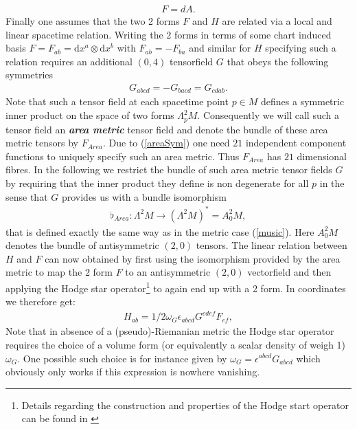 \documentclass[a4paper,12pt, DIV=14, BCOR=5mm, twoside, headsepline]{scrbook}
\begin{document}
\begin{align}
    F = d A.
\end{align}
Finally one assumes that the two 2 forms $F$ and $H$ are related via a local and linear spacetime relation. Writing the 2 forms in terms of some chart induced basis $F = F_{ab} = \mathrm{d}x^a \otimes \mathrm{d}x^b$ with $F_{ab} = - F_{ba}$ and similar for $H$ specifying such a relation requires an additional $(0,4)$ tensorfield $G$ that obeys the following symmetries
\begin{align}\label{areaSym}
    G_{abcd} = -G_{bacd} = G_{cdab}.
\end{align}
Note that such a tensor field at each spacetime point $p\in M$ defines a symmetric inner product on the space of two forms $\Lambda^2_pM$. Consequently we will call such a tensor field an \textbf{\textit{area metric}} tensor field and denote the bundle of these area metric tensors by $F_{Area}$. Due to (\ref{areaSym}) one need $21$ independent component functions to uniquely specify such an area metric. Thus $F_{Area}$ has $21$ dimensional fibres.   In the following we restrict the bundle of such area metric tensor fields $G$ by requiring that the inner product they define is non degenerate for all $p$ in the sense that $G$ provides us with a bundle isomorphism 
\begin{align}
\flat_{Area} : \Lambda^2M \longrightarrow (\Lambda^2M)^{\ast} = A^2_0M,
\end{align}
that is defined exactly the same way as in the metric case (\ref{music}). Here $A^2_0M$ denotes the bundle of antisymmetric $(2,0)$ tensors. 
The linear relation between $H$ and $F$ can now obtained by first using the isomorphism provided by the area metric to map the 2 form $F$ to an antisymmetric $(2,0)$ vectorfield and then applying the Hodge star operator\footnote{Details regarding the construction and properties of the Hodge start operator can be found in \cite{Abraham:1988:MTA:50877}} to again end up with a 2 form. In coordinates we therefore get:
\begin{align}
    H_{ab} = 1/2 \omega_G \epsilon_{abcd} G^{cdef} F_{ef},
\end{align}
Note that in absence of a (pseudo)-Riemanian metric the Hodge star operator requires the choice of a volume form (or equivalently a scalar density of weigh 1) $\omega_G$. One possible such choice is for instance given by $\omega_G = \epsilon^{abcd}G_{abcd}$ which obviously only works if this expression is nowhere vanishing.
\end{document}
